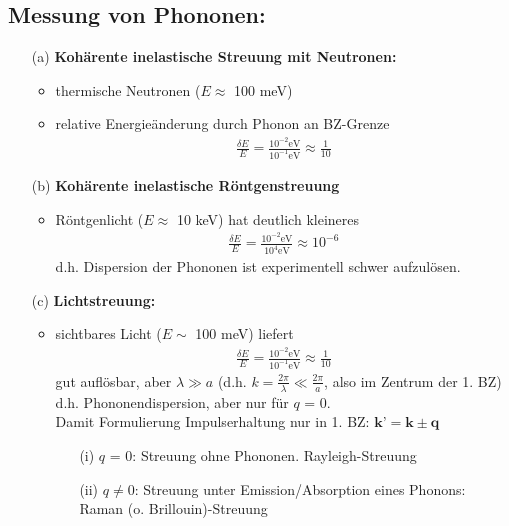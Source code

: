 \subsection*{Messung von Phononen:}
\begin{itemize}
	\item[(a)] \textbf{Kohärente inelastische Streuung mit Neutronen:}
	\begin{itemize}
		\item thermische Neutronen ($E \approx$ 100 meV)
		\item relative Energieänderung durch Phonon an BZ-Grenze
		\begin{align*}
			\frac{\delta E}{E} = \frac{10^{-2} \text{eV}}{10^{-1} \text{eV}} \approx \frac{1}{10}
		\end{align*}
	\end{itemize}
	\item[(b)] \textbf{Kohärente inelastische Röntgenstreuung}
	\begin{itemize}
		\item Röntgenlicht ($E \approx$ 10 keV) hat deutlich kleineres
		\begin{align*}
			\frac{\delta E}{E} = \frac{10^{-2} \text{eV}}{10^{4} \text{eV}} \approx 10^{-6}
		\end{align*}
		d.h. Dispersion der Phononen ist experimentell schwer aufzulösen.
	\end{itemize}
	\item[(c)] \textbf{Lichtstreuung:}
	\begin{itemize}
		\item sichtbares Licht ($E \sim$ 100 meV) liefert
		\begin{align*}
			\frac{\delta E}{E} = \frac{10^{-2} \text{eV}}{10^{-1} \text{eV}} \approx \frac{1}{10}
		\end{align*}
		gut auflösbar, aber $\lambda \gg a$ (d.h. $k = \frac{2 \pi}{\lambda} \ll \frac{2 \pi}{a}$, also im Zentrum der 1. BZ)\\
		d.h. Phononendispersion, aber nur für $q$ = 0.\\
		Damit Formulierung Impulserhaltung nur in 1. BZ: $\textbf{k'} = \textbf{k} \pm \textbf{q}$
		\begin{itemize}
			\item[(i)] $q$ = 0: Streuung ohne Phononen. Rayleigh-Streuung
			\item[(ii)] $q \neq 0$: Streuung unter Emission/Absorption eines Phonons: Raman (o. Brillouin)-Streuung
		\end{itemize}
	\end{itemize}  
\end{itemize}



